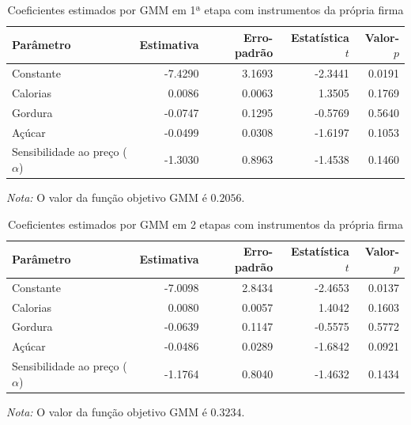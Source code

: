 \begingroup
\begin{table}[H]
\centering
\caption{Coeficientes estimados por GMM em 1ª etapa com instrumentos da própria firma}
\label{tab:coef-gmm1-propria-firma}
\small
\begin{tabular}{lrrrr}
\toprule
Parâmetro & Estimativa & Erro-padrão & Estatística $t$ & Valor-$p$ \\
\midrule
Constante & -7.4290 & 3.1693 & -2.3441 & 0.0191 \\
Calorias & 0.0086 & 0.0063 & 1.3505 & 0.1769 \\
Gordura & -0.0747 & 0.1295 & -0.5769 & 0.5640 \\
Açúcar & -0.0499 & 0.0308 & -1.6197 & 0.1053 \\
Sensibilidade ao preço ($\alpha$) & -1.3030 & 0.8963 & -1.4538 & 0.1460 \\
\bottomrule
\end{tabular}

\vspace{0.3em}
\footnotesize
\textit{Nota:} O valor da função objetivo GMM é $0.2056$.
\end{table}
\endgroup


\begingroup
\begin{table}[H]
\centering
\caption{Coeficientes estimados por GMM em 2 etapas com instrumentos da própria firma}
\label{tab:coef-gmm2-propria-firma}
\small
\begin{tabular}{lrrrr}
\toprule
Parâmetro & Estimativa & Erro-padrão & Estatística $t$ & Valor-$p$ \\
\midrule
Constante & -7.0098 & 2.8434 & -2.4653 & 0.0137 \\
Calorias & 0.0080 & 0.0057 & 1.4042 & 0.1603 \\
Gordura & -0.0639 & 0.1147 & -0.5575 & 0.5772 \\
Açúcar & -0.0486 & 0.0289 & -1.6842 & 0.0921 \\
Sensibilidade ao preço ($\alpha$) & -1.1764 & 0.8040 & -1.4632 & 0.1434 \\
\bottomrule
\end{tabular}

\vspace{0.3em}
\footnotesize
\textit{Nota:} O valor da função objetivo GMM é $0.3234$.
\end{table}
\endgroup

